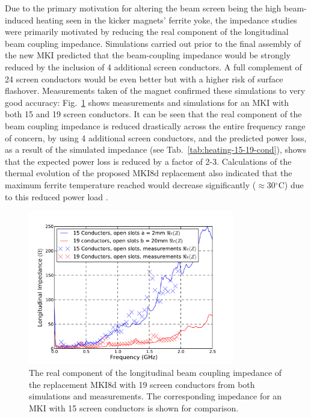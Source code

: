 Due to the primary motivation for altering the beam screen being the high beam-induced heating seen in the kicker magnets' ferrite yoke, the impedance studies were primarily motivated by reducing the real component of the longitudinal beam coupling impedance. Simulations carried out prior to the final assembly of the new MKI predicted that the beam-coupling impedance would be strongly reduced by the inclusion of 4 additional screen conductors. A full complement of 24 screen conductors would be even better but with a higher risk of surface flashover. Measurements taken of the magnet  confirmed these simulations to very good accuracy: Fig.~\ref{fig:mki-19-impedance} shows measurements and simulations for an MKI with both 15 and 19 screen conductors. It can be seen that the real component of the beam coupling impedance is reduced drastically across the entire frequency range of concern, by using 4 additional screen conductors, and the predicted power loss, as a result of the simulated impedance (see Tab.~\ref{tab:heating-15-19-cond}), shows that the expected power loss is reduced by a factor of 2-3. Calculations of the thermal evolution of the proposed MKI8d replacement also indicated that the maximum ferrite temperature reached would decrease significantly ($\approx$30$^{\circ}$C) due to this reduced power load \cite{Garlasche:2dHeatEmis}. 

\begin{figure}
\begin{center}
\includegraphics[width=0.8\textwidth]{LHC_MKI/figures/15_19_sims_measured_comparison.pdf}
\end{center}
\caption{The real component of the longitudinal beam coupling impedance of the replacement MKI8d with 19 screen conductors from both simulations and measurements. The corresponding impedance for an MKI with 15 screen conductors is shown for comparison.}
\label{fig:mki-19-impedance}
\end{figure}

